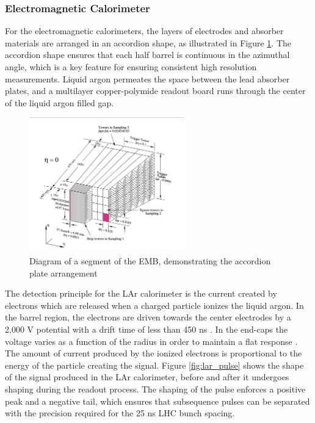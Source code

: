 \subsubsection{Electromagnetic Calorimeter}
For the electromagnetic calorimeters, the layers of electrodes and absorber materials are arranged in an accordion shape, as illustrated in Figure \ref{fig:lar_accordion}. The accordion shape ensures that each half barrel is continuous in the azimuthal angle, which is a key feature for ensuring consistent high resolution measurements. Liquid argon permeates the space between the lead absorber plates, and a multilayer copper-polymide readout board runs through the center of the liquid argon filled gap. \par

\begin{figure}
        \centering
	\includegraphics[width=0.6\textwidth]{figures/ch4/lar_accordion.png}
	\caption{Diagram of a segment of the EMB, demonstrating the accordion plate arrangement \cite{lar_tdr}}
	\label{fig:lar_accordion}
\end{figure}

The detection principle for the LAr calorimeter is the current created by electrons which are released when a charged particle ionizes the liquid argon. In the barrel region, the electrons are driven towards the center electrodes by a 2,000 V potential with a drift time of less than 450 ns \cite{lar_overview}. In the end-caps the voltage varies as a function of the radius in order to maintain a flat response \cite{lar_tdr}. The amount of current produced by the ionized electrons is proportional to the energy of the particle creating the signal. Figure \ref{fig:lar_pulse} shows the shape of the signal produced in the LAr calorimeter, before and after it undergoes shaping during the readout process. The shaping of the pulse enforces a positive peak and a negative tail, which ensures that subsequence pulses can be separated with the precision required for the 25 ns LHC bunch spacing. \par

